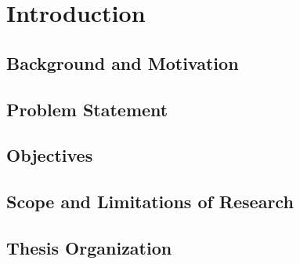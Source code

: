 \graphicspath{{introduction/fig/}}

\chapter{Introduction}
\label{chap:introduction}

\section{Background and Motivation}

\section{Problem Statement}

\section{Objectives}

\section{Scope and Limitations of Research}

\section{Thesis Organization}